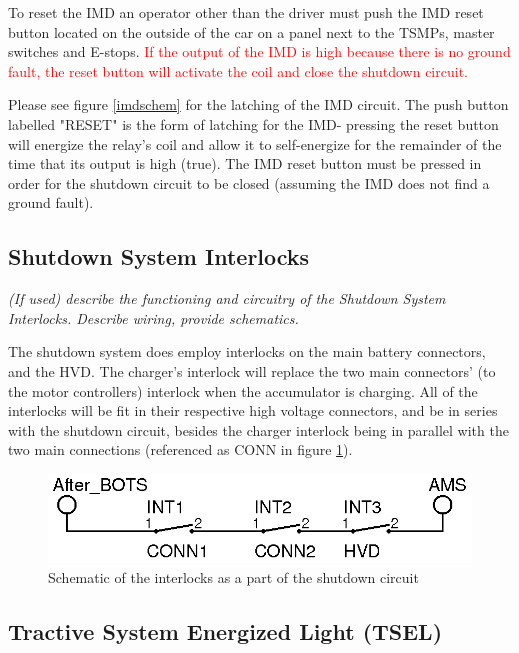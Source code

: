 \documentclass{article}
\begin{document}
To reset the IMD an operator other than the driver must push the IMD reset button located on the outside of the car on a panel next to the TSMPs, master switches and E-stops. \textcolor{red}{If the output of the IMD is high because there is no ground fault, the reset button will activate the coil and close the shutdown circuit.}

Please see figure \ref{imdschem} for the latching of the IMD circuit. The push button labelled "RESET" is the form of latching for the IMD- pressing the reset button will energize the relay's coil and allow it to self-energize for the remainder of the time that its output is high (true). The IMD reset button must be pressed in order for the shutdown circuit to be closed (assuming the IMD does not find a ground fault).

\subsection{Shutdown System Interlocks}

\textit{(If used) describe the functioning and circuitry of the Shutdown System Interlocks. Describe wiring, provide schematics.}

The shutdown system does employ interlocks on the main battery connectors, and the HVD. The charger's interlock will replace the two main connectors' (to the motor controllers) interlock when the accumulator is charging. All of the interlocks will be fit in their respective high voltage connectors, and be in series with the shutdown circuit, besides the charger interlock being in parallel with the two main connections (referenced as CONN in figure \ref{interlocks}).

\begin{figure}[H]
    \centering
    \includegraphics{interlocks}
    \caption{Schematic of the interlocks as a part of the shutdown circuit}
    \label{interlocks}
\end{figure}

\subsection{Tractive System Energized Light (TSEL)}
\end{document}
